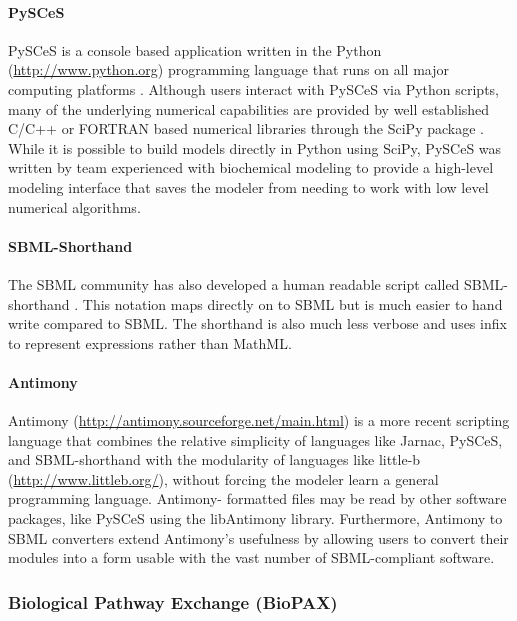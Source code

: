 \paragraph{PySCeS}

PySCeS is a console based application written in the Python
(\url{http://www.python.org}) programming language that runs on all
major computing platforms \autocite{Pysces2004}. Although users interact
with PySCeS via Python scripts, many of the underlying numerical
capabilities are provided by well established C/C++ or FORTRAN based
numerical libraries through the SciPy package
\autocite{olivier2002modelling}. While it is possible to build models
directly in Python using SciPy, PySCeS was written by team experienced
with biochemical modeling to provide a high-level modeling interface
that saves the modeler from needing to work with low level numerical
algorithms.

\paragraph{SBML-Shorthand}

The SBML community has also developed a human readable script called
SBML- shorthand \autocite{gillespie2006tools}. This notation maps
directly on to SBML but is much easier to hand write compared to SBML.
The shorthand is also much less verbose and uses infix to represent
expressions rather than MathML.

\paragraph{Antimony}

Antimony (\url{http://antimony.sourceforge.net/main.html})
\autocite{smith2009antimony} is a more recent scripting language that
combines the relative simplicity of languages like Jarnac, PySCeS, and
SBML-shorthand with the modularity of languages like little-b
(\url{http://www.littleb.org/}), without forcing the modeler learn a
general programming language. Antimony- formatted files may be read by
other software packages, like PySCeS using the libAntimony library.
Furthermore, Antimony to SBML converters extend Antimony's usefulness by
allowing users to convert their modules into a form usable with the vast
number of SBML-compliant software.

\subsubsection{Biological Pathway Exchange (BioPAX)}

